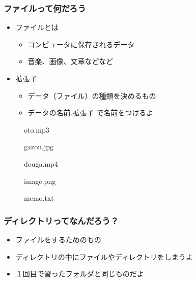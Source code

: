 \begin{frame}
    \frametitle{ファイルって何だろう}
    \begin{itemize}
        \item ファイルとは
        \begin{itemize}
            \item コンピュータに保存されるデータ
            \item 音楽、画像、文章などなど
        \end{itemize}
        \item 拡張子
        \begin{itemize}
            \item データ（ファイル）の種類を決めるもの
            \item データの名前.拡張子 で名前をつけるよ
        \end{itemize}
    \end{itemize}
    
    \begin{figure}[h]
    \centering
    \begin{minipage}[b]{0.19\columnwidth}
        \centering
        
        \caption{oto.mp3}
    \end{minipage}
    \begin{minipage}[b]{0.19\columnwidth}
        \centering
        
        \caption{gazou.jpg}
    \end{minipage}
    \begin{minipage}[b]{0.19\columnwidth}
        \centering
        
        \caption{douga.mp4}
    \end{minipage}
    \begin{minipage}[b]{0.19\columnwidth}
        \centering
        
        \caption{image.png}
    \end{minipage}
    \begin{minipage}[b]{0.19\columnwidth}
        \centering
        
        \caption{memo.txt}
    \end{minipage}
    \end{figure}
\end{frame}

\begin{frame}
    \frametitle{ディレクトリってなんだろう？}
    \begin{itemize}
        \item ファイルをするためのもの
        \item ディレクトリの中にファイルやディレクトリをしまうよ
        \item １回目で習ったフォルダと同じものだよ
    \end{itemize}
\end{frame}

